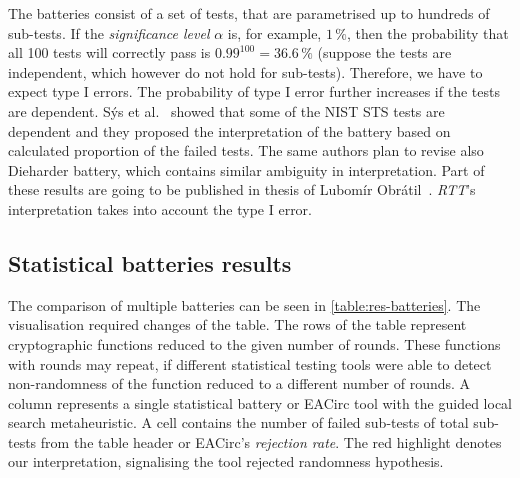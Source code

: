 \documentclass[
    digital,    %
    oneside,    %
    color,
    11pt,
    nocover,
    notable,
    nolof,
    nolot,
]{fithesis3}
\begin{document}
The batteries consist of a set of tests, that are parametrised up to hundreds of sub-tests. If the \textit{significance level} $\alpha$ is, for example, $1\,\%$, then the probability that all 100 tests will correctly pass is $0.99^{100}=36.6\,\%$ (suppose the tests are independent, which however do not hold for sub-tests). Therefore, we have to expect type I errors. The probability of type I error further increases if the tests are dependent. Sýs et al.~\cite{sys2015interpretation} showed that some of the NIST STS tests are dependent and they proposed the interpretation of the battery based on calculated proportion of the failed tests. The same authors plan to revise also Dieharder battery, which contains similar ambiguity in interpretation. Part of these results are going to be published in thesis of Lubomír Obrátil~\cite{obratilMgrThesis}. \textit{RTT}'s interpretation takes into account the type I error.

\subsection{Statistical batteries results}
\label{subsec:relatwork-stat-res}

The comparison of multiple batteries can be seen in \cref{table:res-batteries}. The visualisation required changes of the table. The rows of the table represent cryptographic functions reduced to the given number of rounds. These functions with rounds may repeat, if different statistical testing tools were able to detect non-randomness of the function reduced to a different number of rounds. A column represents a single statistical battery or EACirc tool with the guided local search metaheuristic. A cell contains the number of failed sub-tests of total sub-tests from the table header or EACirc's \textit{rejection rate}. The red highlight denotes our interpretation, signalising the tool rejected randomness hypothesis.
\end{document}
